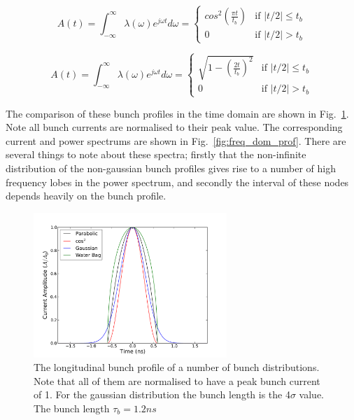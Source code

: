 \begin{equation}
A\left( t \right) = \int^{\infty}_{-\infty} \lambda \left( \omega \right) e^{j\omega t} d\omega = 
\begin{cases}
cos^{2}\left( \frac{\pi t} {t_{b}} \right) &\textrm{if $| t/2 | \leq t_{b}$}\\
0								&\textrm{if $| t/2 | > t_{b}$}
\end{cases}
\label{eqn:cos_profile}
\end{equation}

\begin{equation}
A\left( t \right) = \int^{\infty}_{-\infty} \lambda \left( \omega \right) e^{j\omega t} d\omega = 
\begin{cases}
\sqrt{1-\left( \frac{2t}{t_{b}}\right)^{2}} &\textrm{if $| t/2 | \leq t_{b}$}\\
0								&\textrm{if $| t/2 | > t_{b}$}
\end{cases}
\label{eqn:water_bag_profile}
\end{equation}

The comparison of these bunch profiles in the time domain are shown in Fig.~\ref{fig:time_bunch_profiles}. Note all bunch currents are normalised to their peak value. The corresponding current and power spectrums are shown in Fig.~\ref{fig:freq_dom_prof}. There are several things to note about these spectra; firstly that the non-infinite distribution of the non-gaussian bunch profiles gives rise to a number of high frequency lobes in the power spectrum, and secondly the interval of these nodes depends heavily on the bunch profile.

\begin{figure}
\begin{center}
\includegraphics[width=0.65\textwidth]{figures/wakefields_and_impedance/bunch_profile_12ns.pdf}
\end{center}
\label{fig:time_bunch_profiles}
\caption{The longitudinal bunch profile of a number of bunch distributions. Note that all of them are normalised to have a peak bunch current of 1. For the gaussian distribution the bunch length is the 4$\sigma$ value. The bunch length $\tau_{b} = 1.2ns$}
\end{figure}

